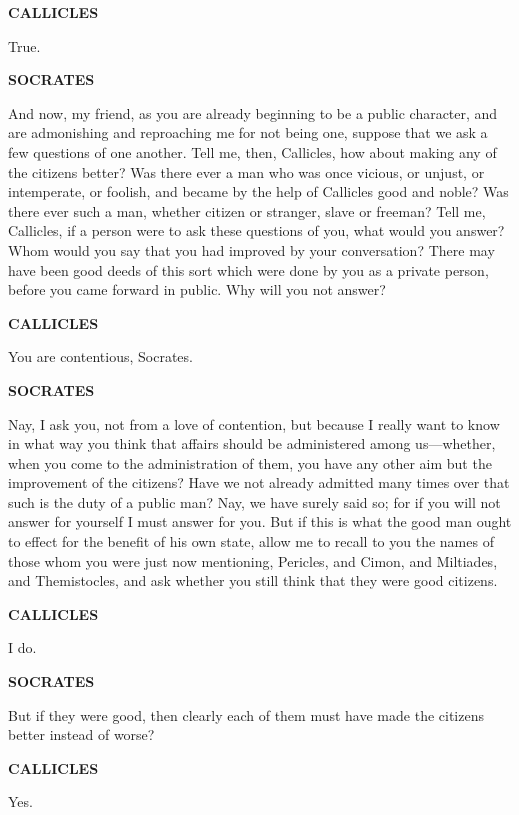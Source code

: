 \documentclass[11pt,letter]{article}
\begin{document}
\par \textbf{CALLICLES}
\par   True.

\par \textbf{SOCRATES}
\par   And now, my friend, as you are already beginning to be a public character, and are admonishing and reproaching me for not being one, suppose that we ask a few questions of one another. Tell me, then, Callicles, how about making any of the citizens better? Was there ever a man who was once vicious, or unjust, or intemperate, or foolish, and became by the help of Callicles good and noble? Was there ever such a man, whether citizen or stranger, slave or freeman? Tell me, Callicles, if a person were to ask these questions of you, what would you answer? Whom would you say that you had improved by your conversation? There may have been good deeds of this sort which were done by you as a private person, before you came forward in public. Why will you not answer?

\par \textbf{CALLICLES}
\par   You are contentious, Socrates.

\par \textbf{SOCRATES}
\par   Nay, I ask you, not from a love of contention, but because I really want to know in what way you think that affairs should be administered among us—whether, when you come to the administration of them, you have any other aim but the improvement of the citizens? Have we not already admitted many times over that such is the duty of a public man? Nay, we have surely said so; for if you will not answer for yourself I must answer for you. But if this is what the good man ought to effect for the benefit of his own state, allow me to recall to you the names of those whom you were just now mentioning, Pericles, and Cimon, and Miltiades, and Themistocles, and ask whether you still think that they were good citizens.

\par \textbf{CALLICLES}
\par   I do.

\par \textbf{SOCRATES}
\par   But if they were good, then clearly each of them must have made the citizens better instead of worse?

\par \textbf{CALLICLES}
\par   Yes.
\end{document}
